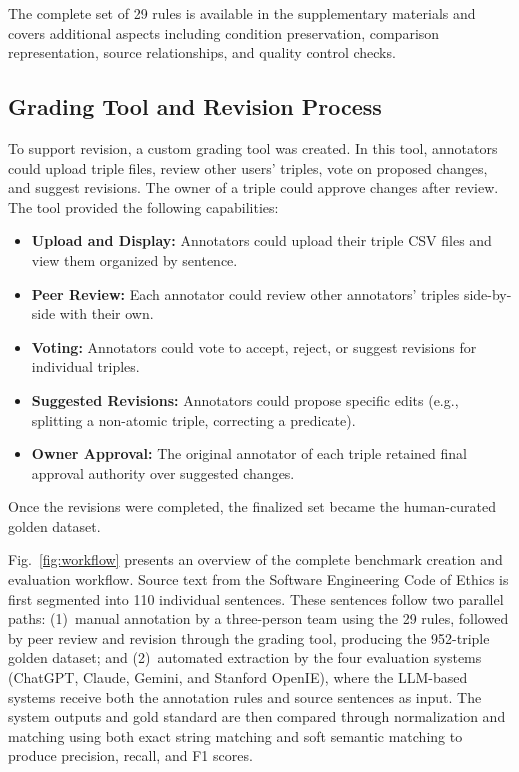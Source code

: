 \documentclass[conference]{IEEEtran}
\begin{document}
The complete set of 29 rules is available in the supplementary materials and covers additional aspects including condition preservation, comparison representation, source relationships, and quality control checks.

\subsection{Grading Tool and Revision Process}
To support revision, a custom grading tool was created. In this tool, annotators could upload triple files, review other users' triples, vote on proposed changes, and suggest revisions. The owner of a triple could approve changes after review. The tool provided the following capabilities:

\begin{itemize}[leftmargin=*]
\item \textbf{Upload and Display:} Annotators could upload their triple CSV files and view them organized by sentence.
\item \textbf{Peer Review:} Each annotator could review other annotators' triples side-by-side with their own.
\item \textbf{Voting:} Annotators could vote to accept, reject, or suggest revisions for individual triples.
\item \textbf{Suggested Revisions:} Annotators could propose specific edits (e.g., splitting a non-atomic triple, correcting a predicate).
\item \textbf{Owner Approval:} The original annotator of each triple retained final approval authority over suggested changes.
\end{itemize}

Once the revisions were completed, the finalized set became the human-curated golden dataset.

Fig.~\ref{fig:workflow} presents an overview of the complete benchmark creation and evaluation workflow. Source text from the Software Engineering Code of Ethics is first segmented into 110 individual sentences. These sentences follow two parallel paths: (1)~manual annotation by a three-person team using the 29 rules, followed by peer review and revision through the grading tool, producing the 952-triple golden dataset; and (2)~automated extraction by the four evaluation systems (ChatGPT, Claude, Gemini, and Stanford OpenIE), where the LLM-based systems receive both the annotation rules and source sentences as input. The system outputs and gold standard are then compared through normalization and matching using both exact string matching and soft semantic matching to produce precision, recall, and F1 scores.
\end{document}
